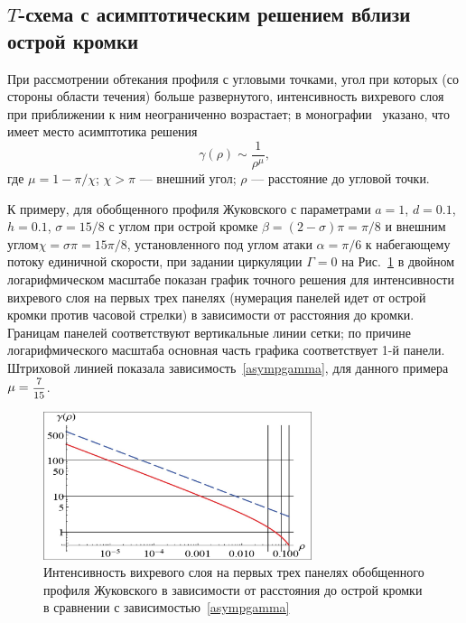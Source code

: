 \documentclass[12pt, a4paper]{article}
\begin{document}
\subsection{$T$-схема с асимптотическим решением вблизи острой кромки}

При рассмотрении обтекания профиля с угловыми точками, угол при которых (со стороны области течения) больше развернутого, интенсивность вихревого слоя при приближении к ним неограниченно возрастает; в монографии~\cite{Lifanov} указано, что имеет место асимптотика решения
\begin{equation}
\label{asympgamma}
\gamma(\rho) \sim \frac{1}{\rho^\mu},
\end{equation}
где $\mu = 1-\pi/\chi$; $\chi > \pi$ --- внешний угол; $\rho$ --- расстояние до угловой точки.

К примеру, для обобщенного профиля Жуковского с параметрами $a=1$, $d=0.1$, $h=0.1$, $\sigma = 15/8$
с углом при острой кромке
$\beta = (2-\sigma)\pi = \pi/8$
и внешним углом\linebreak $\chi=\sigma\pi = 15\pi/8$, установленного под углом атаки $\alpha = {\pi}/{6}$ к набегающему потоку единичной скорости, при задании циркуляции $\Gamma = 0$ на Рис.~\ref{FigExAsPrmLog} в двойном логарифмическом масштабе показан график точного решения для интенсивности вихревого слоя на первых трех панелях (нумерация панелей идет от острой кромки против часовой стрелки) в зависимости от расстояния до кромки. Границам панелей соответствуют вертикальные линии сетки; по причине логарифмического масштаба основная часть графика соответствует 1-й панели. Штриховой линией показала зависимость~\eqref{asympgamma}, для данного примера $\mu = \hbox{\footnotesize$\displaystyle\frac{7}{15}$}$.

\begin{figure}[!h]
	\centering
	\includegraphics[width=0.70\textwidth]{ris11}%
	\caption{\label{FigExAsPrmLog}Интенсивность вихревого слоя на первых трех панелях обобщенного профиля Жуковского в зависимости от расстояния до острой кромки в сравнении с зависимостью~\eqref{asympgamma}}
	\vspace*{-2mm}
\end{figure}
\end{document}
